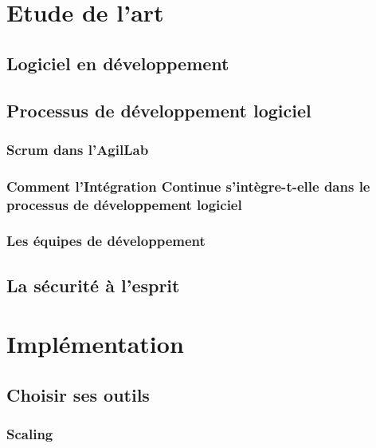 \documentclass{report}
\begin{document}

    

    \chapter{Etude de l'art}

      \section{Logiciel en développement}

      \section{Processus de développement logiciel}

        \subsection{Scrum dans l'AgilLab}

        \subsection{Comment l’Intégration Continue s’intègre-t-elle dans le processus de développement logiciel}

        \subsection{Les équipes de développement}

      \section{La sécurité à l'esprit}

    \chapter{Implémentation}

      \section{Choisir ses outils}

        \subsection{Scaling}
\end{document}

